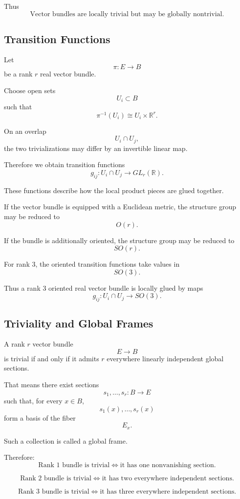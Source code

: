 \documentclass[12pt,a4paper]{article}
\theoremstyle{notespace}
\begin{document}
Thus
\[
\boxed{
	\text{Vector bundles are locally trivial but may be globally nontrivial.}
}
\]

\subsection{Transition Functions}

Let
\[
\pi:E\to B
\]
be a rank \(r\) real vector bundle.

Choose open sets
\[
U_i\subset B
\]
such that
\[
\pi^{-1}(U_i)\cong U_i\times \mathbb R^r.
\]

On an overlap
\[
U_i\cap U_j,
\]
the two trivializations may differ by an invertible linear map.

Therefore we obtain transition functions
\[
g_{ij}:U_i\cap U_j\to GL_r(\mathbb R).
\]

These functions describe how the local product pieces are glued together.

If the vector bundle is equipped with a Euclidean metric, the structure group may be reduced to
\[
O(r).
\]

If the bundle is additionally oriented, the structure group may be reduced to
\[
SO(r).
\]

For rank \(3\), the oriented transition functions take values in
\[
SO(3).
\]

Thus a rank \(3\) oriented real vector bundle is locally glued by maps
\[
g_{ij}:U_i\cap U_j\to SO(3).
\]

\subsection{Triviality and Global Frames}

A rank \(r\) vector bundle
\[
E\to B
\]
is trivial if and only if it admits \(r\) everywhere linearly independent global sections.

That means there exist sections
\[
s_1,\dots,s_r:B\to E
\]
such that, for every \(x\in B\),
\[
s_1(x),\dots,s_r(x)
\]
form a basis of the fiber
\[
E_x.
\]

Such a collection is called a global frame.

Therefore:
\[
\boxed{
	\text{Rank }1\text{ bundle is trivial}
	\Longleftrightarrow
	\text{it has one nonvanishing section.}
}
\]

\[
\boxed{
	\text{Rank }2\text{ bundle is trivial}
	\Longleftrightarrow
	\text{it has two everywhere independent sections.}
}
\]

\[
\boxed{
	\text{Rank }3\text{ bundle is trivial}
	\Longleftrightarrow
	\text{it has three everywhere independent sections.}
}
\]
\end{document}
